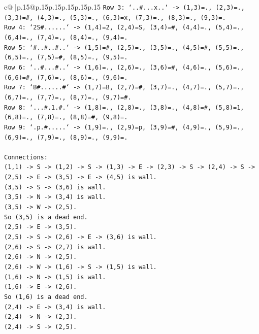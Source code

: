\documentclass{article}
\begin{document}
{\begin{supertabular}{c@{$\;$}|p{.15\linewidth}@{}p{.15\linewidth}p{.15\linewidth}p{.15\linewidth}p{.15\linewidth}p{.15\linewidth}}
{{{\texttt{Row 3: `..\#...x..` {-}> (1,3)=., (2,3)=., (3,3)=\#, (4,3)=., (5,3)=., (6,3)=x, (7,3)=., (8,3)=., (9,3)=.} \\
\texttt{Row 4: `2S\#......` {-}> (1,4)=2, (2,4)=S, (3,4)=\#, (4,4)=., (5,4)=., (6,4)=., (7,4)=., (8,4)=., (9,4)=.} \\
\texttt{Row 5: `\#..\#..\#..` {-}> (1,5)=\#, (2,5)=., (3,5)=., (4,5)=\#, (5,5)=., (6,5)=., (7,5)=\#, (8,5)=., (9,5)=.} \\
\texttt{Row 6: `..\#...\#..` {-}> (1,6)=., (2,6)=., (3,6)=\#, (4,6)=., (5,6)=., (6,6)=\#, (7,6)=., (8,6)=., (9,6)=.} \\
\texttt{Row 7: `B\#......\#` {-}> (1,7)=B, (2,7)=\#, (3,7)=., (4,7)=., (5,7)=., (6,7)=., (7,7)=., (8,7)=., (9,7)=\#.} \\
\texttt{Row 8: `...\#.1.\#.` {-}> (1,8)=., (2,8)=., (3,8)=., (4,8)=\#, (5,8)=1, (6,8)=., (7,8)=., (8,8)=\#, (9,8)=.} \\
\texttt{Row 9: `.p.\#.....` {-}> (1,9)=., (2,9)=p, (3,9)=\#, (4,9)=., (5,9)=., (6,9)=., (7,9)=., (8,9)=., (9,9)=.} \\
\\ 
\texttt{Connections:} \\
\texttt{(1,1) {-}> S {-}> (1,2) {-}> S {-}> (1,3) {-}> E {-}> (2,3) {-}> S {-}> (2,4) {-}> S {-}> (2,5) {-}> E {-}> (3,5) {-}> E {-}> (4,5) is wall.} \\
\texttt{(3,5) {-}> S {-}> (3,6) is wall.} \\
\texttt{(3,5) {-}> N {-}> (3,4) is wall.} \\
\texttt{(3,5) {-}> W {-}> (2,5).} \\
\texttt{So (3,5) is a dead end.} \\
\texttt{(2,5) {-}> E {-}> (3,5).} \\
\texttt{(2,5) {-}> S {-}> (2,6) {-}> E {-}> (3,6) is wall.} \\
\texttt{(2,6) {-}> S {-}> (2,7) is wall.} \\
\texttt{(2,6) {-}> N {-}> (2,5).} \\
\texttt{(2,6) {-}> W {-}> (1,6) {-}> S {-}> (1,5) is wall.} \\
\texttt{(1,6) {-}> N {-}> (1,5) is wall.} \\
\texttt{(1,6) {-}> E {-}> (2,6).} \\
\texttt{So (1,6) is a dead end.} \\
\texttt{(2,4) {-}> E {-}> (3,4) is wall.} \\
\texttt{(2,4) {-}> N {-}> (2,3).} \\
\texttt{(2,4) {-}> S {-}> (2,5).} \\
}}}
\end{supertabular}}
\end{document}
